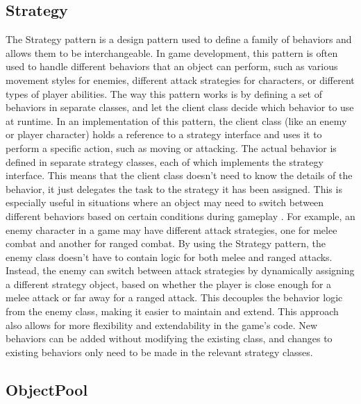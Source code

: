\documentclass[]{final_report}
\begin{document}
\subsection{Strategy}\label{strategy}
\color{black}The Strategy pattern is a design pattern used to define a family of behaviors and allows them to be interchangeable. \color{red} In game development, this pattern is often used to handle different behaviors that an object can perform, such as various movement styles for enemies, different attack strategies for characters, or different types of player abilities. The way this pattern works is by defining a set of behaviors in separate classes, and let the client class decide which behavior to use at runtime.
\newline
In an implementation of this pattern, the client class (like an enemy or player character) holds a reference to a strategy interface and uses it to perform a specific action, such as moving or attacking. The actual behavior is defined in separate strategy classes, each of which implements the strategy interface. This means that the client class doesn't need to know the details of the behavior, it just delegates the task to the strategy it has been assigned. This is especially useful in situations where an object may need to switch between different behaviors based on certain conditions during gameplay \cite{Doran2017}.
\newline
For example, an enemy character in a game may have different attack strategies, one for melee combat and another for ranged combat. By using the Strategy pattern, the enemy class doesn’t have to contain logic for both melee and ranged attacks. Instead, the enemy can switch between attack strategies by dynamically assigning a different strategy object, based on whether the player is close enough for a melee attack or far away for a ranged attack. This decouples the behavior logic from the enemy class, making it easier to maintain and extend. This approach also allows for more flexibility and extendability in the game's code. New behaviors can be added without modifying the existing class, and changes to existing behaviors only need to be made in the relevant strategy classes. 


\color{black}









\subsection{ObjectPool}\label{objectpool}
\end{document}
